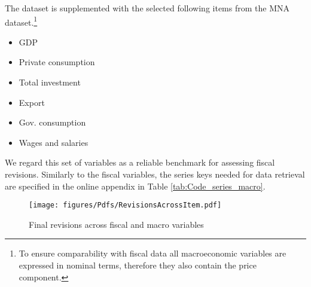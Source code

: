 The dataset is supplemented with the selected following items from the MNA
dataset.\footnote{To ensure comparability with fiscal data all macroeconomic variables
are expressed in nominal terms, therefore they also contain the price component.} 
\begin{itemize}
    \item GDP
    \item {{Private consumption}}
    \item {{Total investment}}
    \item {{Export}}
    \item {{Gov. consumption}}
    \item {{Wages and salaries}}
\end{itemize}

We regard this set of variables as a reliable benchmark for assessing fiscal revisions. Similarly to the fiscal variables, the series keys needed for data retrieval are specified in the online appendix
in Table \ref{tab:Code_series_macro}.

\begin{figure}[H]
\centering{}\caption{Final revisions across fiscal and macro variables \label{fig:revisions_across_variables}}
\centering
\texttt{[image: figures/Pdfs/RevisionsAcrossItem.pdf]}
\end{figure}

